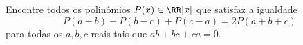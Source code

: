 Encontre todos os polinômios $P(x) \in \RR[x]$ que satisfaz a igualdade
$$ P(a-b) + P(b-c) + P(c-a) = 2P(a + b + c) $$
para todas os $a, b, c$ reais tais que $ab + bc + ca = 0$.
